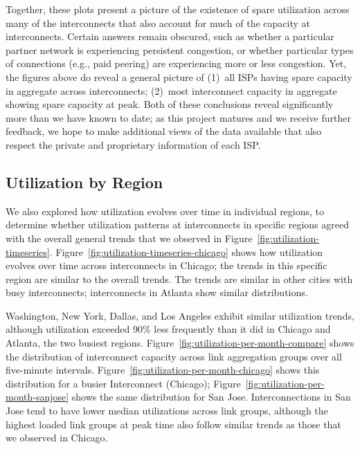 Together, these plots present a picture of the existence of spare
utilization across many of the interconnects that also account for much
of the capacity at interconnects. Certain answers remain obscured, such
as whether a particular partner network is experiencing persistent
congestion, or whether particular types of connections (e.g., paid
peering) are experiencing more or less congestion. Yet, the figures
above do reveal a general picture of (1)~all ISPs having spare capacity
in aggregate across interconnects; (2)~most interconnect capacity in
aggregate showing spare capacity at peak. Both of these conclusions
reveal significantly more than we have known to date; as this project
matures and we receive further feedback, we hope to make additional
views of the data available that also respect the private and
proprietary information of each ISP.

\subsection{Utilization by Region}

We also explored how utilization evolves over time in individual
regions, to determine whether utilization patterns at interconnects in
specific regions agreed with the overall general trends that we observed
in Figure~\ref{fig:utilization-timeseries}.
Figure~\ref{fig:utilization-timeseries-chicago} shows how utilization
evolves over time across interconnects in Chicago; the trends in this
specific region are similar to the overall trends.  The trends are
similar in other cities with busy interconnects; interconnects in
Atlanta show similar distributions.


Washington, New York, Dallas, and Los Angeles exhibit similar
utilization trends, although utilization exceeded 90\% less frequently
than it did in Chicago and Atlanta, the two busiest regions.
Figure~\ref{fig:utilization-per-month-compare} shows the distribution of
interconnect capacity across link aggregation groups over all
five-minute intervals. Figure~\ref{fig:utilization-per-month-chicago}
shows this distribution for a busier Interconnect (Chicago); 
Figure~\ref{fig:utilization-per-month-sanjose} shows the same
distribution for San Jose.
%
Interconnections in San Jose tend to have
lower median utilizations across link groups, although the highest loaded
link groups at peak time also follow similar trends as those that we
observed in Chicago.


